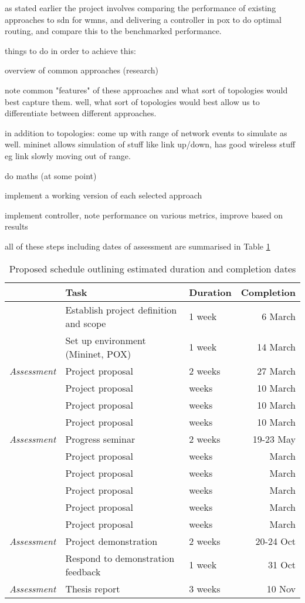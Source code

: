 \documentclass[pdftex,12pt,a4paper]{article}
\begin{document}
as stated earlier the project involves comparing the performance of existing approaches to sdn for wmns, and delivering a controller in pox to do optimal routing, and compare this to the benchmarked performance.

things to do in order to achieve this:

overview of common approaches (research)

note common "features" of these approaches and what sort of topologies would best capture them. well, what sort of topologies would best allow us to differentiate between different approaches.

in addition to topologies: come up with range of network events to simulate as well. mininet allows simulation of stuff like link up/down, has good wireless stuff eg link slowly moving out of range.

do maths (at some point)

implement a working version of each selected approach

implement controller, note performance on various metrics, improve based on results

all of these steps including dates of assessment are summarised in Table \ref{table:schedule}

\begin{table}[H]
	\begin{center}
		\begin{tabular}{@{}rllr@{}}
			\toprule
			& Task & Duration & Completion\\
			\midrule
			& Establish project definition and scope & 1 week & 6 March \\
			& Set up environment (Mininet,  POX) & 1 week & 14 March \\
			\emph{Assessment} & Project proposal & 2 weeks & 27 March \\
			& Project proposal & weeks & 10 March \\
			& Project proposal & weeks & 10 March \\
			& Project proposal & weeks & 10 March \\
			\emph{Assessment} & Progress seminar & 2 weeks & 19-23 May \\
			& Project proposal & weeks & March \\
			& Project proposal & weeks & March \\
			& Project proposal & weeks & March \\
			& Project proposal & weeks & March \\
			& Project proposal & weeks & March \\
			\emph{Assessment} & Project demonstration & 2 weeks & 20-24 Oct \\
			& Respond to demonstration feedback & 1 week & 31 Oct \\
			\emph{Assessment} & Thesis report & 3 weeks & 10 Nov \\
			\bottomrule
		\end{tabular}
		\caption{Proposed schedule outlining estimated duration and completion dates}
		\label{table:schedule}
	\end{center}
\end{table}
\end{document}

